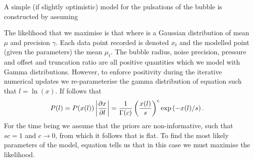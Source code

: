 
A simple (if slightly optimistic) model for the pulsations of the bubble 
is constructed by  assuming

The likelihood that we maximise is that
where 
is a Gaussian distribution of mean $\mu$ and precision  $\gamma$.
Each data point recorded is denoted $x_t$ and the modelled point (given the parameters) the mean  $\mu_t$.
The bubble radius, noise precision, pressure and offset and truncation ratio are all positive quantities which we model with Gamma distributions.
However, to enforce positivity during the iterative numerical updates 
we re-parameterise the gamma distribution of equation  such that $l = \ln(x)$.
If follows that
\begin{align}
  P(l) = P(x(l))\left| \frac{\partial x}{\partial l} \right| = \frac{1}{\Gamma(c)}\left( \frac{x(l)}{s} \right)^c\exp\left( -x(l)/s \right).
\label{eqn:logGamma}
\end{align}
For the time being we assume that the priors are non-informative, such that $sc = 1$ and $c\rightarrow 0$,
from which it follows that  is flat.
To find the most likely parameters of the model, 
equation  tells us that in this case we must  maximise the likelihood.




